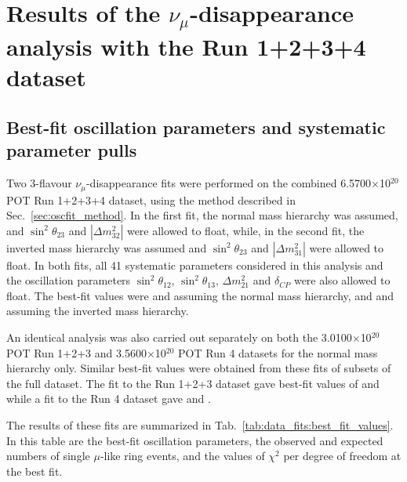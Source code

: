 \clearpage

\section {Results of the $\nu_{\mu}$-disappearance analysis with the Run 1+2+3+4 %
dataset}
\label{sec:results}


\subsection {Best-fit oscillation parameters and systematic parameter pulls}
\label{sec:results_bestfit}

Two 3-flavour $\nu_{\mu}$-disappearance fits were performed on the combined 6.5700$\times$10$^{20}$ 
POT Run 1+2+3+4 dataset, using the method described in Sec.\ \ref{sec:oscfit_method}.
In the first fit, the normal mass hierarchy was assumed, and $\sin^{2}\theta_{23}$ and $|\Delta m^{2}_{32}|$ 
were allowed to float, while, in the second fit, the inverted mass hierarchy was assumed and $\sin^{2}\theta_{23}$ 
and $|\Delta m^{2}_{31}|$ were allowed to float. In both fits, all 41 systematic parameters considered in this analysis 
and the oscillation parameters $\sin^{2}\theta_{12}$, $\sin^{2}\theta_{13}$, $\Delta m^{2}_{21}$ and $\delta_{CP}$ were 
also allowed to float. 
The best-fit values were \resultNormalMixing and \resultNormalDmsq assuming the normal mass hierarchy, 
and \resultInvertedDmsq and \resultInvertedMixing assuming the inverted mass hierarchy. 

An identical analysis was also carried out separately on both the 3.0100$\times$10$^{20}$ POT Run 1+2+3 and
3.5600$\times$10$^{20}$ POT Run 4 datasets for the normal mass hierarchy only.
Similar best-fit values were obtained from these fits of subsets of the full dataset. 
The fit to the Run 1+2+3 dataset gave best-fit values of 
\resultNormalRunITIIIMixing and \resultNormalRunITIIIDmsq
while a fit to the Run 4 dataset gave 
\resultNormalRunIVMixing and \resultNormalRunIVDmsq.

The results of these fits are summarized in Tab.\ \ref{tab:data_fits:best_fit_values}. In this table are 
the best-fit oscillation parameters, the observed and expected numbers of single $\mu$-like ring events,
and the values of $\chi^{2}$ per degree of freedom at the best fit.

